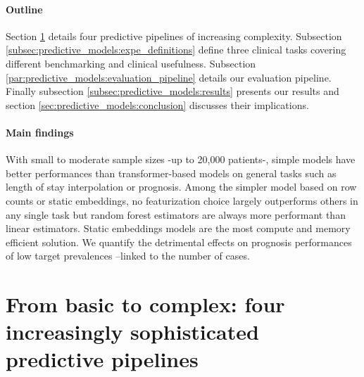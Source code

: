 \documentclass[french,12pt,twoside,a4paper]{book}
\begin{document}
\paragraph{Outline}
Section \ref{sec:predictive_models:pipelines} details four predictive pipelines
of increasing complexity. Subsection
\ref{subsec:predictive_models:expe_definitions} define three clinical tasks
covering different benchmarking and clinical usefulness. Subsection
\ref{par:predictive_models:evaluation_pipeline} details our evaluation
pipeline. Finally subsection \ref{subsec:predictive_models:results} presents our
results and section \ref{sec:predictive_models:conclusion} discusses their
implications.

\paragraph{Main findings}

With small to moderate sample sizes -up to 20,000 patients-, simple models have
better performances than transformer-based models on general tasks such as
length of stay interpolation or prognosis. Among the simpler model based on row counts or
static embeddings, no featurization choice largely outperforms others in any
single task but random forest estimators are always more performant than linear
estimators. Static embeddings models are the most compute and memory efficient
solution. We quantify the detrimental effects on prognosis performances of
low target prevalences --linked to the number of cases.



\section{From basic to complex: four increasingly sophisticated predictive pipelines}%
\label{sec:predictive_models:pipelines}%
\end{document}

